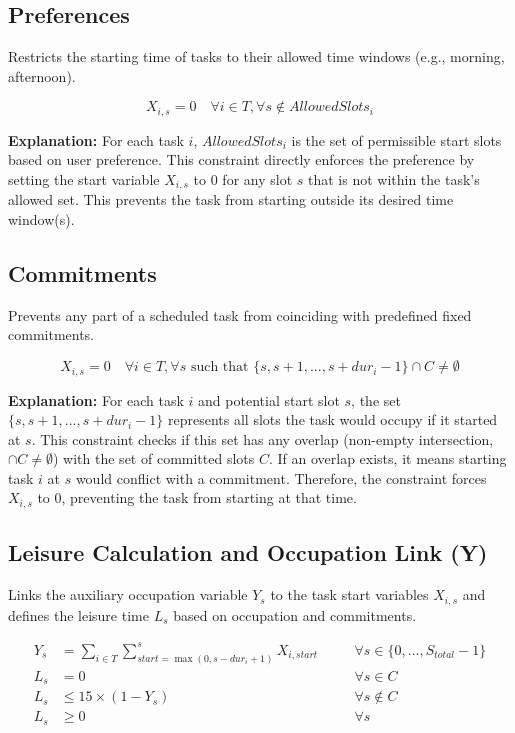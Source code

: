 \documentclass{article}
\begin{document}
\subsection{Preferences}
Restricts the starting time of tasks to their allowed time windows (e.g., morning, afternoon).

\[
X_{i,s} = 0 \quad \forall i \in T, \forall s \notin AllowedSlots_i
\]

\textbf{Explanation:} For each task $i$, $AllowedSlots_i$ is the set of permissible start slots based on user preference. This constraint directly enforces the preference by setting the start variable $X_{i,s}$ to 0 for any slot $s$ that is not within the task's allowed set. This prevents the task from starting outside its desired time window(s).

\subsection{Commitments}
Prevents any part of a scheduled task from coinciding with predefined fixed commitments.

\[
X_{i,s} = 0 \quad \forall i \in T, \forall s \text{ such that } \{s, s+1, ..., s + dur_i - 1\} \cap C \neq \emptyset
\]

\textbf{Explanation:} For each task $i$ and potential start slot $s$, the set $\{s, s+1, ..., s + dur_i - 1\}$ represents all slots the task would occupy if it started at $s$. This constraint checks if this set has any overlap (non-empty intersection, $\cap C \neq \emptyset$) with the set of committed slots $C$. If an overlap exists, it means starting task $i$ at $s$ would conflict with a commitment. Therefore, the constraint forces $X_{i,s}$ to 0, preventing the task from starting at that time.

\subsection{Leisure Calculation and Occupation Link (Y)}
Links the auxiliary occupation variable $Y_s$ to the task start variables $X_{i,s}$ and defines the leisure time $L_s$ based on occupation and commitments.

\begin{align}
Y_s &= \sum_{i \in T} \sum_{start = \max(0, s - dur_i + 1)}^{s} X_{i,start} \quad &&\forall s \in \{0, ..., S_{total}-1\} \label{eq:link_y} \\
L_s &= 0 \quad &&\forall s \in C \label{eq:leisure_commit} \\
L_s &\le 15 \times (1 - Y_s) \quad &&\forall s \notin C \label{eq:leisure_task} \\
L_s &\ge 0 \quad &&\forall s \label{eq:leisure_nonneg}
\end{align}
\end{document}
